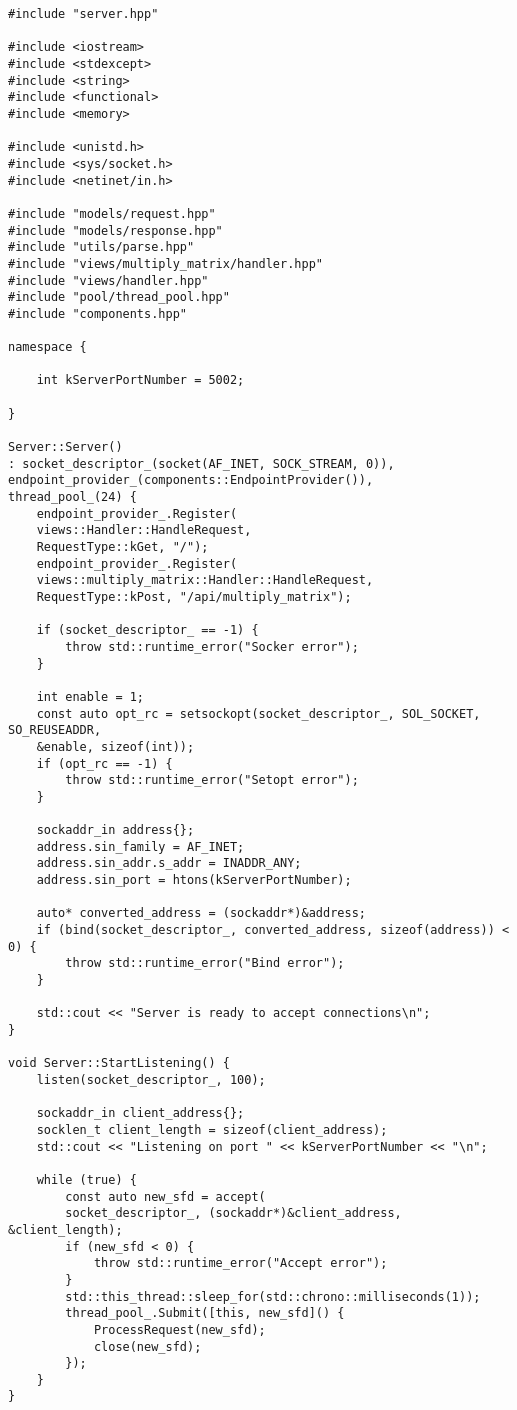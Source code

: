 \begin{lstlisting}[caption=Реализация сервара из файла server/server.cpp]
#include "server.hpp"

#include <iostream>
#include <stdexcept>
#include <string>
#include <functional>
#include <memory>

#include <unistd.h>
#include <sys/socket.h>
#include <netinet/in.h>

#include "models/request.hpp"
#include "models/response.hpp"
#include "utils/parse.hpp"
#include "views/multiply_matrix/handler.hpp"
#include "views/handler.hpp"
#include "pool/thread_pool.hpp"
#include "components.hpp"

namespace {
	
	int kServerPortNumber = 5002;
	
}

Server::Server()
: socket_descriptor_(socket(AF_INET, SOCK_STREAM, 0)),
endpoint_provider_(components::EndpointProvider()),
thread_pool_(24) {
	endpoint_provider_.Register(
	views::Handler::HandleRequest,
	RequestType::kGet, "/");
	endpoint_provider_.Register(
	views::multiply_matrix::Handler::HandleRequest,
	RequestType::kPost, "/api/multiply_matrix");
	
	if (socket_descriptor_ == -1) {
		throw std::runtime_error("Socker error");
	}
	
	int enable = 1;
	const auto opt_rc = setsockopt(socket_descriptor_, SOL_SOCKET, SO_REUSEADDR,
	&enable, sizeof(int));
	if (opt_rc == -1) {
		throw std::runtime_error("Setopt error");
	}
	
	sockaddr_in address{};
	address.sin_family = AF_INET;
	address.sin_addr.s_addr = INADDR_ANY;
	address.sin_port = htons(kServerPortNumber);
	
	auto* converted_address = (sockaddr*)&address;
	if (bind(socket_descriptor_, converted_address, sizeof(address)) < 0) {
		throw std::runtime_error("Bind error");
	}
	
	std::cout << "Server is ready to accept connections\n";
}

void Server::StartListening() {
	listen(socket_descriptor_, 100);
	
	sockaddr_in client_address{};
	socklen_t client_length = sizeof(client_address);
	std::cout << "Listening on port " << kServerPortNumber << "\n";
	
	while (true) {
		const auto new_sfd = accept(
		socket_descriptor_, (sockaddr*)&client_address, &client_length);
		if (new_sfd < 0) {
			throw std::runtime_error("Accept error");
		}
		std::this_thread::sleep_for(std::chrono::milliseconds(1));
		thread_pool_.Submit([this, new_sfd]() {
			ProcessRequest(new_sfd);
			close(new_sfd);
		});
	}
}


\end{lstlisting}
